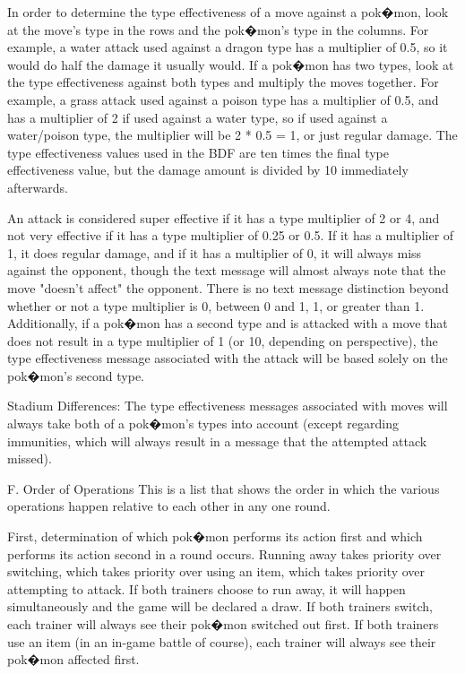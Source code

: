 \documentclass[reprint, aps, prl, paper=A4]{revtex4-1}
\begin{document}
In order to determine the type effectiveness of a move against a pok�mon, look at the move's
type in the rows and the pok�mon's type in the columns. For example, a water attack used
against a dragon type has a multiplier of 0.5, so it would do half the damage it usually would.
If a pok�mon has two types, look at the type effectiveness against both types and multiply the
moves together. For example, a grass attack used against a poison type has a multiplier of 0.5,
and has a multiplier of 2 if used against a water type, so if used against a water/poison type,
the multiplier will be 2 * 0.5 = 1, or just regular damage. The type effectiveness values used
in the BDF are ten times the final type effectiveness value, but the damage amount is divided
by 10 immediately afterwards.

An attack is considered super effective if it has a type multiplier of 2 or 4, and not very
effective if it has a type multiplier of 0.25 or 0.5. If it has a multiplier of 1, it does
regular damage, and if it has a multiplier of 0, it will always miss against the opponent,
though the text message will almost always note that the move "doesn't affect" the opponent.
There is no text message distinction beyond whether or not a type multiplier is 0, between 0
and 1, 1, or greater than 1. Additionally, if a pok�mon has a second type and is attacked with
a move that does not result in a type multiplier of 1 (or 10, depending on perspective), the
type effectiveness message associated with the attack will be based solely on the pok�mon's
second type.

Stadium Differences:
The type effectiveness messages associated with moves will always take both of a pok�mon's
types into account (except regarding immunities, which will always result in a message that the
attempted attack missed).



F. Order of Operations
This is a list that shows the order in which the various operations happen relative to each
other in any one round.

First, determination of which pok�mon performs its action first and which performs its action
second in a round occurs. Running away takes priority over switching, which takes priority over
using an item, which takes priority over attempting to attack. If both trainers choose to run
away, it will happen simultaneously and the game will be declared a draw. If both trainers
switch, each trainer will always see their pok�mon switched out first. If both trainers use an
item (in an in-game battle of course), each trainer will always see their pok�mon affected
first.
\end{document}
